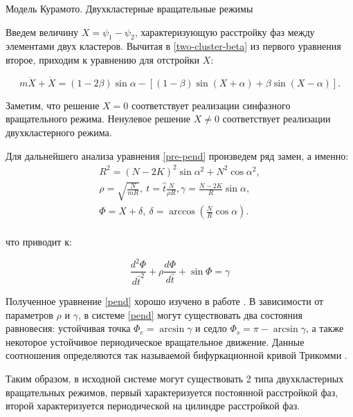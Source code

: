 \begin{chapter}{Модель Курамото. Двухкластерные вращательные режимы}
	
	Введем величину $X = \psi_1 - \psi_2$, характеризующую расстройку фаз между элементами двух кластеров.
	Вычитая в \ref{two-cluster-beta} из первого уравнения второе, приходим к уравнению для отстройки $X$:

	\begin{equation} \label{pre-pend}
		m\ddot{X} + \dot{X} = (1 - 2 \beta) \sin{\alpha} - \left[(1-\beta)\sin{(X + \alpha)} + \beta\sin{(X - \alpha)} \right].
	\end{equation}
	
	Заметим, что решение $X = 0$ соответствует реализации
	синфазного вращательного режима. Ненулевое решение $X \neq 0$ соответствует
	реализации двухкластерного режима.
	
	
	Для дальнейшего анализа уравнения \ref{pre-pend} произведем ряд замен, а именно:
	\begin{align*}
	R^2 = (N - 2K)^2 \sin{\alpha}^2 + N^2 \cos{\alpha}^2, \\
	\rho = \sqrt{\frac{N}{m R}}, \ t = \hat{t} \frac{N}{\rho R}, \gamma = \frac{N - 2K}{R}\sin{\alpha}, \\
	\Phi = X + \delta, \ \delta = \arccos{(\frac{N}{R}\cos{\alpha})}. \\
	\end{align*}
	
	что приводит к:
	
	\begin{equation} \label{pend}
		\frac{d^2 \Phi }{d\hat{t}^2} + \rho \frac{d\Phi}{d\hat{t}} + \sin{\Phi} = \gamma
	\end{equation}

	Полученное уравнение \ref{pend} хорошо изучено в работе \cite{Andronov:Vitt}.
	В зависимости от параметров $\rho$ и $\gamma$, в системе \ref{pend}
	могут существовать два состояния равновесия:
	устойчивая точка $\Phi_e = \arcsin{\gamma}$ и седло
	$\Phi_s = \pi - \arcsin{\gamma}$, а также
	некоторое устойчивое периодическое вращательное движение.
	Данные соотношения определяются так называемой
	бифуркационной кривой Трикомми \cite{Andronov:Vitt}.

	Таким образом, в исходной системе могут существовать 2 типа
	двухкластерных вращательных режимов, первый характеризуется
	постоянной расстройкой фаз, второй характеризуется
    периодической на цилиндре расстройкой фаз.


\end{chapter}
